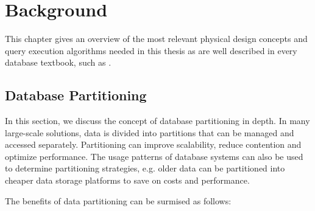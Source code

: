 \chapter{Background}
\label{chapter:background}
This chapter gives an overview of the most relevant physical design concepts and query execution algorithms needed in this thesis as are well described in every database textbook, such as \cite{Ramakrishnan:2002:DMS:560733, DBLP:books/mg/SKS20}.

\section{Database Partitioning}
In this section, we discuss the concept of database partitioning in depth. In many large-scale solutions, data is divided into partitions that can be managed and accessed separately. Partitioning can improve scalability, reduce contention and optimize performance. The usage patterns of database systems can also be used to determine partitioning strategies, e.g. older data can be partitioned into cheaper data storage platforms to save on costs and performance.

The benefits of data partitioning can be surmised as follows:

